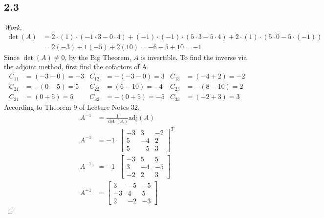 \documentclass{article}
\begin{document}
\subsection*{2.3}

\begin{proof}[Work]
    \begin{align*}
        \det(A) & = 2 \cdot (1) \cdot (-1 \cdot 3 - 0 \cdot 4) + (-1) \cdot (-1) \cdot (5 \cdot 3 - 5 \cdot 4) + 2 \cdot (1) \cdot (5 \cdot 0 - 5 \cdot (-1)) \\
                & = 2(-3) + 1(-5) + 2(10) = -6 -5 + 10 = -1
    \end{align*}
    Since $\det(A) \neq 0$, by the Big Theorem, $A$ is invertible. To find the inverse via the adjoint method, first find the cofactors of A.
    \begin{align*}
        C_{11} & = (-3 - 0) = -3 & C_{12} & = -(-3-0) = 3 & C_{13} & = (-4+2) = -2 \\
        C_{21} & = -(0-5) = 5    & C_{22} & = (6-10) = -4 & C_{23} & = -(8-10) = 2 \\
        C_{31} & = (0+5) = 5     & C_{32} & = -(0+5) = -5 & C_{33} & = (-2+3) = 3
    \end{align*}
    According to Theorem 9 of Lecture Notes 32,
    \begin{align*}
        A^{-1} & = \frac{1}{\det(A)}\text{adj}(A) \\
        A^{-1} & = -1 \cdot \begin{bmatrix}
                                -3 & 3  & -2 \\
                                5  & -4 & 2  \\
                                5  & -5 & 3
                            \end{bmatrix}^T       \\
        A^{-1} & = -1 \cdot \begin{bmatrix}
                                -3 & 5  & 5  \\
                                3  & -4 & -5 \\
                                -2 & 2  & 3
                            \end{bmatrix}        \\
        A^{-1} & = \begin{bmatrix}
                       3  & -5 & -5 \\
                       -3 & 4  & 5  \\
                       2  & -2 & -3
                   \end{bmatrix}
    \end{align*}
\end{proof}
\qdash
\end{document}
